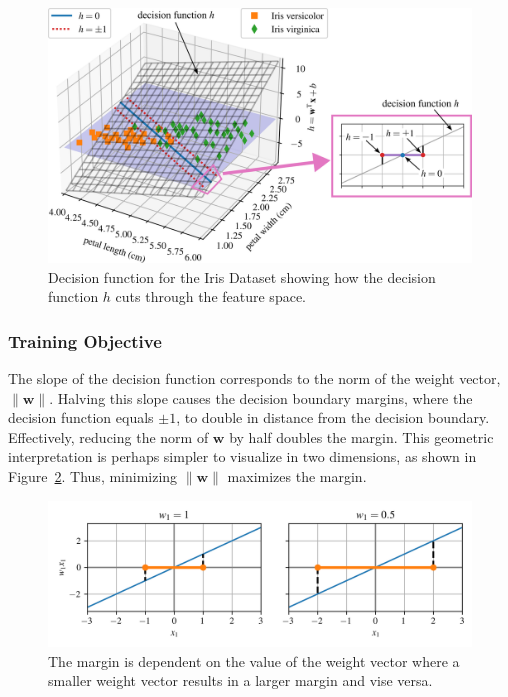 \documentclass[12pt,letter]{article}
\begin{document}
\begin{figure}[H]
	\centering
	\includegraphics[]{../figures/SVM_decision_function}
	\caption{Decision function for the Iris Dataset showing how the decision function $h$ cuts through the feature space.}
	\label{fig:SVM_decision_function}
\end{figure}


\subsubsection{Training Objective}

The slope of the decision function corresponds to the norm of the weight vector, $\|\textbf{w}\|$. Halving this slope causes the decision boundary margins, where the decision function equals $\pm 1$, to double in distance from the decision boundary. Effectively, reducing the norm of $\textbf{w}$ by half doubles the margin. This geometric interpretation is perhaps simpler to visualize in two dimensions, as shown in Figure~\ref{fig:SVM_weight_vectors}. Thus, minimizing $\|\textbf{w}\|$ maximizes the margin.

\begin{figure}[H]
	\centering
	\includegraphics[width=6.5in]{../figures/SVM_weight_vectors}
	\caption{The margin is dependent on the value of the weight vector where a smaller weight vector results in a larger margin and vise versa.}
	\label{fig:SVM_weight_vectors}
\end{figure}
\end{document}
